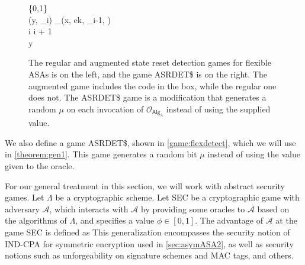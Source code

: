 \begin{figure}
\begin{pchstack}
\begin{pcvstack}
{	\pcind \mu \sample \{0,1\} \\
	\pcind (y, \tau_i) \sample {}_\lambda(x, ek, \tau_{i-1}, \mu) \\
	\pcind i \leftarrow i + 1 \\
	\pcreturn y
}
\end{pcvstack}
\end{pchstack}
\caption[The regular and augmented state reset detection games for flexible ASAs and the game ASRDET\$]{The regular and augmented state reset detection games for flexible ASAs is on the left, and the game ASRDET\$ is on the right. The augmented game includes the code in the box, while the regular one does not. The ASRDET\$ game is a modification that generates a random $\mu$ on each invocation of $\mathcal{O}_{\mathsf{Alg}_\lambda}$ instead of using the supplied value.}
\label{game:flexdetect}
\end{figure}

We also define a game ASRDET\$, shown in \autoref{game:flexdetect}, which we will use in \autoref{theorem:gen1}. This game generates a random bit $\mu$ instead of using the value given to the oracle.

For our general treatment in this section, we will work with abstract security games. Let $\mathsf{\Lambda}$ be a cryptographic scheme. Let SEC be a cryptographic game with adversary $\mathcal{A}$, which interacts with $\mathcal{A}$ by providing some oracles to $\mathcal{A}$ based on the algorithms of $\mathsf{\Lambda}$, and specifies a value $\phi \in [0,1]$. The advantage of $\mathcal{A}$ at the game SEC is defined as
This generalization encompasses the security notion of IND-CPA for symmetric encryption used in \autoref{sec:asymASA2}, as well as security notions such as unforgeability on signature schemes and MAC tags, and others.

